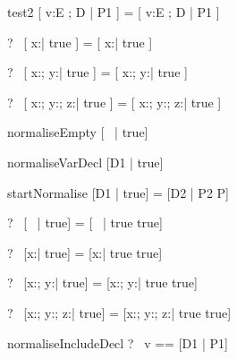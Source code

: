 \begin{zedrule}{test2}
  [ v:E ; D | P1 ] = [ v:E ; D | P1 ]
\end{zedrule}

\begin{zed}
  \vdash?~ [ x:\nat | true ] = [ x:\nat | true ]
\end{zed}

\begin{zed}
  \vdash?~ [ x:\nat; y:\nat | true ] = [ x:\nat; y:\nat | true ]
\end{zed}

\begin{zed}
  \vdash?~ [ x:\nat; y:\nat ; z:\nat | true ] =
           [ x:\nat; y:\nat ; z:\nat | true ]
\end{zed}



\begin{zedrule}{normaliseEmpty}
   [~ | true] \unfoldsTo [~ | true]
\end{zedrule}

\begin{zedrule}{normaliseVarDecl}
   [D1 | true] \unfoldsTo [D2 | P2]
\derives
   [v:E; D1 | true] \unfoldsTo [v:E; D2 | P2]
\end{zedrule}

\begin{zedrule}{startNormalise}
   [D1 | true] \unfoldsTo [D2 | P2]
\derives
   [D1 | P] = [D2 | P2 \land P]
\end{zedrule}

\begin{zed}
  \vdash?~ [~ | true] = [~ | true \land true]
\end{zed}

\begin{zed}
  \vdash?~ [x:\nat | true] = [x:\nat | true \land true]
\end{zed}

\begin{zed}
  \vdash?~ [x:\nat ; y:\nat | true] = [x:\nat ; y:\nat | true \land true]
\end{zed}

\begin{zed}
  \vdash?~ [x:\nat ; y:\nat ; z:\nat | true] =
           [x:\nat ; y:\nat ; z:\nat | true \land true]
\end{zed}



\begin{zedrule}{normaliseIncludeDecl}
   \proviso ?~ v == [D1 | P1] \\
\derives
   [v; D | true] \unfoldsTo [D1 | P1 \land P2]
\end{zedrule}

